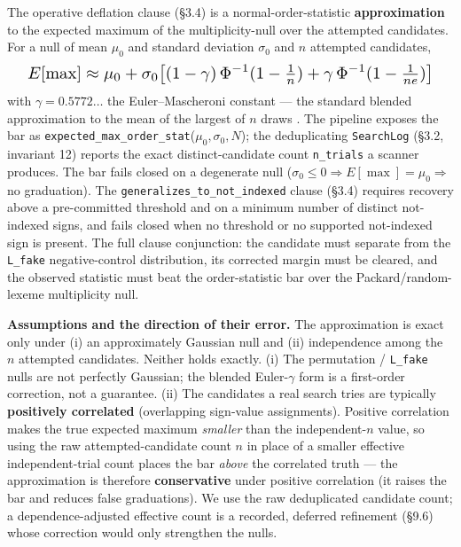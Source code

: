The operative deflation clause (\S3.4) is a normal-order-statistic
\textbf{approximation} to the expected maximum of the multiplicity-null over
the attempted candidates. For a null of mean $\mu_0$ and standard deviation
$\sigma_0$ and $n$ attempted candidates,
\[
  \resizebox{0.95\columnwidth}{!}{$\displaystyle
  E[\max] \approx \mu_0 + \sigma_0\bigl[(1-\gamma)\,\Phi^{-1}(1-\tfrac{1}{n})
  + \gamma\,\Phi^{-1}(1-\tfrac{1}{ne})\bigr]$}
\]
with $\gamma = 0.5772\ldots$ the Euler--Mascheroni constant --- the standard
blended approximation to the mean of the largest of $n$ draws
\citep[\emph{Order Statistics}, 3rd ed.]{david2003}. The
pipeline exposes the bar as
\texttt{expected\_max\_order\_stat}($\mu_0, \sigma_0, N$); the
deduplicating \texttt{SearchLog}
(\S3.2, invariant 12) reports the exact distinct-candidate count
\texttt{n\_trials} a scanner produces. The bar fails closed on a degenerate null
($\sigma_0 \le 0 \Rightarrow E[\max] = \mu_0 \Rightarrow$ no graduation).
The \texttt{generalizes\_to\_not\_indexed} clause (\S3.4) requires recovery
above a pre-committed threshold and on a minimum number of distinct
not-indexed signs, and fails closed when no threshold or no supported
not-indexed sign is present. The full clause conjunction: the candidate
must separate from the \texttt{L\_fake} negative-control distribution,
its corrected margin must be cleared, and the observed statistic must
beat the order-statistic bar over the Packard/random-lexeme multiplicity
null.

\textbf{Assumptions and the direction of their error.} The approximation is
exact only under (i) an approximately Gaussian null and (ii) independence
among the $n$ attempted candidates. Neither holds exactly. (i) The
permutation / \texttt{L\_fake} nulls are not perfectly Gaussian; the blended
Euler-$\gamma$ form is a first-order correction, not a guarantee. (ii) The
candidates a real search tries are typically \textbf{positively correlated}
(overlapping sign-value assignments). Positive correlation makes the true
expected maximum \emph{smaller} than the independent-$n$ value, so using the
raw attempted-candidate count $n$ in place of a smaller effective
independent-trial count places the bar \emph{above} the correlated truth ---
the approximation is therefore \textbf{conservative} under positive
correlation (it raises the bar and reduces false graduations). We use the
raw deduplicated candidate count; a dependence-adjusted effective count is a
recorded, deferred refinement (\S9.6) whose correction would only strengthen
the nulls.

